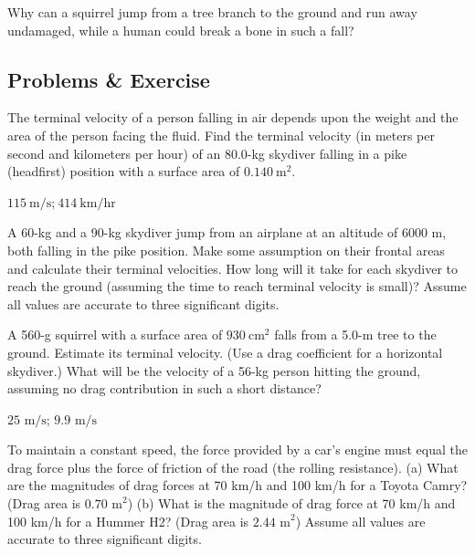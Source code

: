 \documentclass[
]{book}
\begin{document}
\hypertarget{fs-id1165296346967}{}
\leavevmode{}%
Why can a squirrel jump from a tree branch to the ground and run away
undamaged, while a human could break a bone in such a fall?

\hypertarget{fs-id1165298548394}{}
\hypertarget{problems-exercise}{%
\subsection{Problems \& Exercise}\label{problems-exercise}}

\hypertarget{fs-id1165298861311}{}
\leavevmode{}%
The terminal velocity of a person falling in air depends upon the weight
and the area of the person facing the fluid. Find the terminal velocity
(in meters per second and kilometers per hour) of an 80.0-kg skydiver
falling in a pike (headfirst) position with a surface area of
\({0\text{.}\text{140}\ \text{m}^{2}}{}\).

\leavevmode{}%
\({\text{115}\ \text{m/s;}\ \text{414}\ \text{km/hr}}{}\)

\hypertarget{fs-id1165298948219}{}
\leavevmode{}%
A 60-kg and a 90-kg skydiver jump from an airplane at an altitude of
6000 m, both falling in the pike position. Make some assumption on their
frontal areas and calculate their terminal velocities. How long will it
take for each skydiver to reach the ground (assuming the time to reach
terminal velocity is small)? Assume all values are accurate to three
significant digits.

\hypertarget{fs-id1165298835347}{}
\leavevmode{}%
A 560-g squirrel with a surface area of \({\text{930}\ \text{cm}^{2}}{}\)
falls from a 5.0-m tree to the ground. Estimate its terminal velocity.
(Use a drag coefficient for a horizontal skydiver.) What will be the
velocity of a 56-kg person hitting the ground, assuming no drag
contribution in such a short distance?

\leavevmode{}%
\(\text{25\ m/s;\ 9.9\ m/s}{}\)

\hypertarget{fs-id1165298803376}{}
\leavevmode{}%
To maintain a constant speed, the force provided by a car's engine must
equal the drag force plus the force of friction of the road (the rolling
resistance). (a) What are the magnitudes of drag forces at 70 km/h and
100 km/h for a Toyota Camry? (Drag area is \(\text{0.70\ m}^{2}{}\)) (b)
What is the magnitude of drag force at 70 km/h and 100 km/h for a Hummer
H2? (Drag area is \({2\text{.}\text{44\ m}^{2}}{}\)) Assume all values are
accurate to three significant digits.
\end{document}
